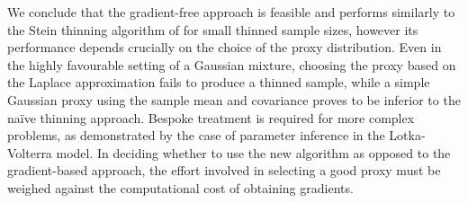 \documentclass[11pt,a4paper]{report}
\begin{document}
We conclude that the gradient-free approach is feasible and performs similarly to the Stein thinning algorithm of \cite{riabizOptimalThinningMCMC2022} for small thinned sample sizes, however its performance depends crucially on the choice of the proxy distribution. Even in the highly favourable setting of a Gaussian mixture, choosing the proxy based on the Laplace approximation fails to produce a thinned sample, while a simple Gaussian proxy using the sample mean and covariance proves to be inferior to the na\"ive thinning approach. Bespoke treatment is required for more complex problems, as demonstrated by the case of parameter inference in the Lotka-Volterra model. In deciding whether to use the new algorithm as opposed to the gradient-based approach, the effort involved in selecting a good proxy must be weighed against the computational cost of obtaining gradients.
\end{document}
